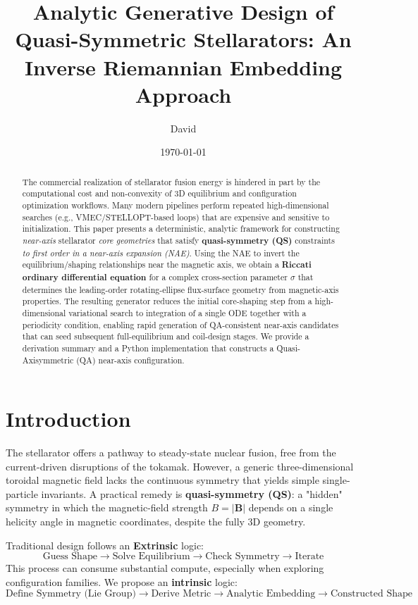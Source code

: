 \documentclass{article}
\title{Analytic Generative Design of Quasi-Symmetric Stellarators: An Inverse Riemannian Embedding Approach}
\author{David}
\date{\today}
\begin{document}
\maketitle

\begin{abstract}
The commercial realization of stellarator fusion energy is hindered in part by the computational cost and non-convexity of 3D equilibrium and configuration optimization workflows. Many modern pipelines perform repeated high-dimensional searches (e.g., VMEC/STELLOPT-based loops) that are expensive and sensitive to initialization. This paper presents a deterministic, analytic framework for constructing \emph{near-axis} stellarator \emph{core geometries} that satisfy \textbf{quasi-symmetry (QS)} constraints \emph{to first order in a near-axis expansion (NAE)}. Using the NAE to invert the equilibrium/shaping relationships near the magnetic axis, we obtain a \textbf{Riccati ordinary differential equation} for a complex cross-section parameter $\sigma$ that determines the leading-order rotating-ellipse flux-surface geometry from magnetic-axis properties. The resulting generator reduces the initial core-shaping step from a high-dimensional variational search to integration of a single ODE together with a periodicity condition, enabling rapid generation of QA-consistent near-axis candidates that can seed subsequent full-equilibrium and coil-design stages. We provide a derivation summary and a Python implementation that constructs a Quasi-Axisymmetric (QA) near-axis configuration.
\end{abstract}

\section{Introduction}

The stellarator offers a pathway to steady-state nuclear fusion, free from the current-driven disruptions of the tokamak. However, a generic three-dimensional toroidal magnetic field lacks the continuous symmetry that yields simple single-particle invariants. A practical remedy is \textbf{quasi-symmetry (QS)}: a "hidden" symmetry in which the magnetic-field strength $B = |\mathbf{B}|$ depends on a single helicity angle in magnetic coordinates, despite the fully 3D geometry.

Traditional design follows an \textbf{Extrinsic} logic:
\[ \text{Guess Shape} \rightarrow \text{Solve Equilibrium} \rightarrow \text{Check Symmetry} \rightarrow \text{Iterate} \]
This process can consume substantial compute, especially when exploring configuration families. We propose an \textbf{intrinsic} logic:
\[ \text{Define Symmetry (Lie Group)} \rightarrow \text{Derive Metric} \rightarrow \text{Analytic Embedding} \rightarrow \text{Constructed Shape} \]
\end{document}
